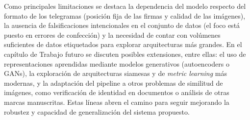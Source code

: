 Como principales limitaciones se destaca la dependencia del modelo respecto del formato de los telegramas (posición fija de las firmas y calidad de las imágenes), la ausencia de falsificaciones intencionales en el conjunto de datos (el foco está puesto en errores de confección) y la necesidad de contar con volúmenes suficientes de datos etiquetados para explorar arquitecturas más grandes. En el capítulo de Trabajo futuro se discuten posibles extensiones, entre ellas: el uso de representaciones aprendidas mediante modelos generativos (autoencoders o GANs), la exploración de arquitecturas siamesas y de \textit{metric learning} más modernas, y la adaptación del pipeline a otros problemas de similitud de imágenes, como verificación de identidad en documentos o análisis de otras marcas manuscritas. Estas líneas abren el camino para seguir mejorando la robustez y capacidad de generalización del sistema propuesto.


